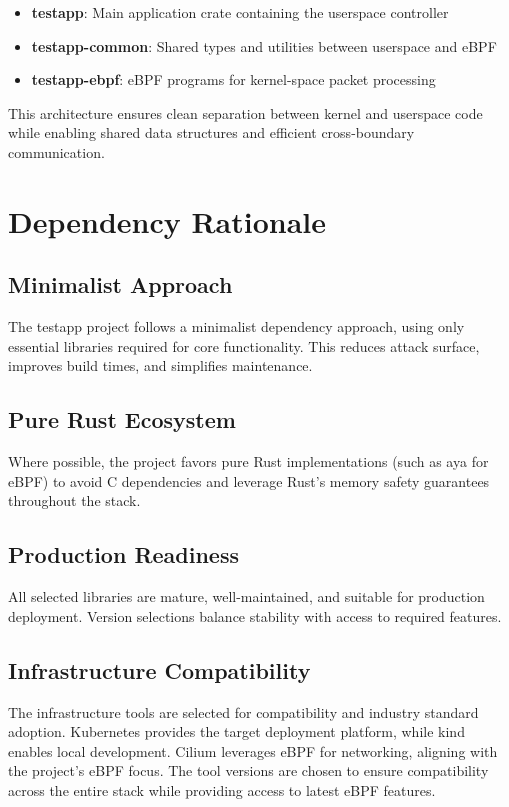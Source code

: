 \documentclass{article}
\begin{document}
\begin{itemize}
    \item \textbf{testapp}: Main application crate containing the userspace controller
    \item \textbf{testapp-common}: Shared types and utilities between userspace and eBPF
    \item \textbf{testapp-ebpf}: eBPF programs for kernel-space packet processing
\end{itemize}

This architecture ensures clean separation between kernel and userspace code while enabling shared data structures and efficient cross-boundary communication.

\section*{Dependency Rationale}

\subsection*{Minimalist Approach}
The testapp project follows a minimalist dependency approach, using only essential libraries required for core functionality. This reduces attack surface, improves build times, and simplifies maintenance.

\subsection*{Pure Rust Ecosystem}
Where possible, the project favors pure Rust implementations (such as aya for eBPF) to avoid C dependencies and leverage Rust's memory safety guarantees throughout the stack.

\subsection*{Production Readiness}
All selected libraries are mature, well-maintained, and suitable for production deployment. Version selections balance stability with access to required features.

\subsection*{Infrastructure Compatibility}
The infrastructure tools are selected for compatibility and industry standard adoption. Kubernetes provides the target deployment platform, while kind enables local development. Cilium leverages eBPF for networking, aligning with the project's eBPF focus. The tool versions are chosen to ensure compatibility across the entire stack while providing access to latest eBPF features.
\end{document}
